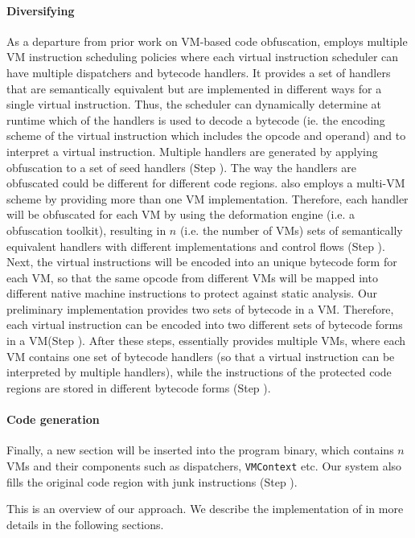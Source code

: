 \paragraph*{Diversifying}
As a departure from prior work on VM-based code obfuscation, \DSVMP employs multiple VM instruction scheduling policies
where each virtual instruction scheduler can have multiple dispatchers and bytecode handlers. It provides a set of handlers
that are semantically equivalent but are implemented in different ways for a single virtual instruction.
Thus, the scheduler can dynamically determine at runtime which of the handlers is used to decode a bytecode (ie. the encoding
scheme of the virtual instruction which includes the opcode and operand) and to interpret a virtual instruction.
Multiple handlers are generated by applying obfuscation to a set of seed handlers (Step ).
The way the handlers are obfuscated could be different for different code regions.
\DSVMP also employs a multi-VM scheme by providing more than one VM implementation.
Therefore, each handler will be obfuscated for each VM by using the deformation engine (i.e. a obfuscation toolkit), resulting in $n$ (i.e. the number of VMs) sets of semantically equivalent handlers with different implementations and control flows (Step ).
Next, the virtual instructions will be encoded into an unique bytecode form for each VM, so that the same opcode from different
VMs will be mapped into different native machine instructions to protect against static analysis.
Our preliminary implementation provides two sets of bytecode in a VM. Therefore, each
virtual instruction can be encoded into two different sets of bytecode forms in a VM(Step ).
After these steps, \DSVMP essentially provides multiple VMs,
where each VM contains one set of bytecode handlers (so that a virtual instruction can be interpreted by multiple handlers),
while the instructions of the protected code regions are stored in different bytecode forms (Step ).

\paragraph*{Code generation}
Finally, a new section will be inserted into the program binary, which contains $n$ VMs and their components such as dispatchers, \texttt{VMContext} etc. Our system also fills the original code region with junk instructions (Step ).

This is an overview of our approach. We describe the implementation of \DSVMP in more details in the following sections.
